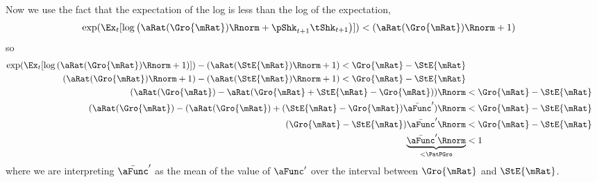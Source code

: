 \documentclass[\econtexRoot/BufferStockTheory]{subfiles}
\begin{document}
Now we use the fact that the expectation of the log is less than the log of the expectation, 
\begin{equation}\begin{split}
 \exp(\Ex_{t}[\log \left(\aRat(\Gro{\mRat})\Rnorm+\pShk_{t+1}\tShk_{t+1}\right)]) & < \left(\aRat(\Gro{\mRat})\Rnorm+1    \right)
\end{split}\end{equation}
so
\begin{equation}\begin{split}
    \exp(\Ex_{t}[\log \left(\aRat(\Gro{\mRat})\Rnorm+1\right)]) - (\aRat(\StE{\mRat})\Rnorm+1 ) < \Gro{\mRat} - \StE{\mRat}
\\    \left(\aRat(\Gro{\mRat})\Rnorm+1\right) - (\aRat(\StE{\mRat})\Rnorm+1 ) < \Gro{\mRat} - \StE{\mRat}    
\\     (\aRat(\Gro{\mRat})-\aRat(\Gro{\mRat}+\StE{\mRat}-\Gro{\mRat}))\Rnorm& < \Gro{\mRat} - \StE{\mRat}
\\     (\aRat(\Gro{\mRat})-(\aRat(\Gro{\mRat})+(\StE{\mRat}-\Gro{\mRat})\bar{\aFunc}^{\prime})\Rnorm& < \Gro{\mRat} - \StE{\mRat}
\\     (\Gro{\mRat}-\StE{\mRat})\bar{\aFunc}^{\prime}\Rnorm& < \Gro{\mRat} - \StE{\mRat}
\\     \underbrace{\bar{\aFunc}^{\prime}\Rnorm}_{< \PatPGro} & < 1
\end{split}\end{equation}
where we are interpreting $\bar{\aFunc}^{\prime}$ as the mean of the value of $\aFunc^{\prime}$ over the interval between $\Gro{\mRat}$ and $\StE{\mRat}$.
\begin{comment}
\subsection{Comment}

Due to the model's nonlinearities the values of $\mRat$ at which the expected growth rate of $\cLevBF$ matches $\PGro$ is very slightly different from the $\mRat$ at which the growth rate at which expected growth of $\mLevBF$ is $\PGro$.  Defining $\grave{\mRat}$ as the $\mRat$ at which $\Ex_{t}[\cRatBF_{t+1}/\cRatBF_{t}]=\PGro$, we can show that to first order $\grave{\mRat} \approx \StE{\mRat}.$
\begin{align*}
  \Ex_{t}[\cFunc(\mRat_{t+1})\pShk_{t+1}] & = \cFunc(\mRat_{t}) \label{eq:balgrostableC}.
  \\ \Ex_{t}[\left(\cFunc(\grave{\mRat})+\cFunc^{\prime}(\grave{\mRat})(\mRat_{t+1}-\grave{\mRat})\right)\pShk_{t+1}] & \approx \cFunc(\grave{\mRat})
  \\ \Ex_{t}[\left(\cFunc^{\prime}(\grave{\mRat})(\mRat_{t+1}-\grave{\mRat})\right)\pShk_{t+1}] & \approx 0
  \\ \Ex_{t}[\mRat_{t+1}] & \approx \grave{\mRat} 
\end{align*}
but at $\mRat=\StE{\mRat}$, $\Ex_{t}[\mRat_{t+1}]=\Trg{\mRat}\approx\grave{\mRat}$.
\end{comment}
\end{document}
